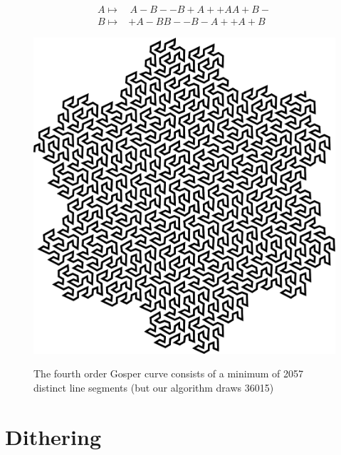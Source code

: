 \documentclass[12pt,openany,a4,usenames,dvipsnames]{book}
\begin{document}
\begin{align*}
A\mapsto{}&\,A{-}B{-}{-}B{+}A{+}{+}AA{+}B{-}\\
B\mapsto{}&{+}A{-}BB{-}{-}B{-}A{+}{+}A{+}B
\end{align*}
\skelpar%
\clearpage{}
\thispagestyle{empty}
\hfill
\begin{figure}[H]
  \centering
  \includegraphics[width=\textwidth,keepaspectratio]{figures/gosper4.pdf}\par
  \vspace{1em}
  {\noindent{}The fourth order Gosper curve consists of a minimum of 2057 distinct line segments (but our algorithm draws 36015)}
\end{figure}
\hfill
\clearpage{}
\chapter{Dithering}
\clearpage{}
\end{document}
